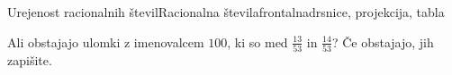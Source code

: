 \begin{priprava}{7}{}{Urejenost racionalnih števil}{Racionalna števila}{frontalna}{drsnice, projekcija, tabla}
\begin{naloga}
    \end{naloga}

    \begin{naloga}
        Ali obstajajo ulomki z imenovalcem $100$, ki so med $\frac{13}{53}$ in $\frac{14}{53}$? Če obstajajo, jih zapišite.
        
    \end{naloga}



\end{priprava}